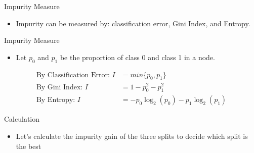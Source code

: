 \documentclass[
  ignorenonframetext,
]{beamer}
\providecommand{\tightlist}{%
  \setlength{\itemsep}{0pt}\setlength{\parskip}{0pt}}\usepackage{longtable,booktabs,array}
\begin{document}
\begin{frame}{Impurity Measure}
\label{impurity-measure-2}
\begin{itemize}
\tightlist
\item
  Impurity can be measured by: classification error, Gini Index, and
  Entropy.
\end{itemize}
\end{frame}

\begin{frame}{Impurity Measure}
\label{impurity-measure-3}
\begin{itemize}
\tightlist
\item
  Let \(p_0\) and \(p_1\) be the proportion of class 0 and class 1 in a
  node.
\end{itemize}

\begin{align*}
{\text{By Classification Error: }} I &= min\{p_0, p_1\} \\
{\text{By Gini Index: }} I&= 1 - p_0^2-p_1^2 \\
{\text{By Entropy: }} I &= -p_0 \log_2(p_0)-p_1\log_2(p_1) 
\end{align*}
\end{frame}

\begin{frame}{Calculation}
\label{calculation}
\begin{itemize}
\tightlist
\item
  Let's calculate the impurity gain of the three splits to decide which
  split is the best
\end{itemize}
\end{frame}
\end{document}
